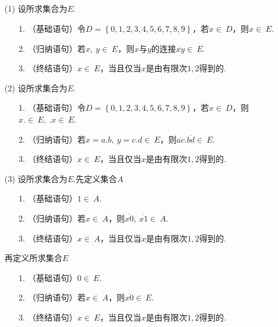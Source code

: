 \documentclass[UTF8]{ctexart}
\begin{document}
\subsection{}   %
\begin{enumerate}
    \item [(1)]设所求集合为$E$.
    \begin{enumerate}
        \item [1.]（基础语句）令$D=\left\{0,1,2,3,4,5,6,7,8,9\right\}$，若$x\in\ D$，则$x\in\ E$.
        \item [2.]（归纳语句）若$x,\ y\in\ E$，则$x$与$y$的连接$\overline{xy}\in\ E$.
        \item [3.]（终结语句）$x\in \ E$，当且仅当$x$是由有限次$1,2$得到的.
    \end{enumerate}

    \item [(2)]设所求集合为$E$.
    \begin{enumerate}
        \item [1.]（基础语句）令$D=\left\{0,1,2,3,4,5,6,7,8,9\right\}$，若$x\in\ D$，则$x.\in\ E,\ .x\in\ E$.
        \item [2.]（归纳语句）若$x=a.b,\ y=c.d\in\ E$，则$\overline{ac} . \overline{bd}\in\ E$.
        \item [3.]（终结语句）$x\in \ E$，当且仅当$x$是由有限次$1,2$得到的.
    \end{enumerate}

    \item [(3)]设所求集合为$E$.先定义集合$A$
    \begin{enumerate}
        \item [1.]（基础语句）$1\in\ A$.
        \item [2.]（归纳语句）若$x\in\ A$，则$\overline{x0},\ \overline{x1}\in \ A$.
        \item [3.]（终结语句）$x\in \ A$，当且仅当$x$是由有限次$1,2$得到的.
    \end{enumerate}
    再定义所求集合$E$
    \begin{enumerate}
        \item [1.]（基础语句）$0\in\ E$.
        \item [2.]（归纳语句）若$x\in\ A$，则$\overline{x0}\in \ E$.
        \item [3.]（终结语句）$x\in \ E$，当且仅当$x$是由有限次$1,2$得到的.
    \end{enumerate}
\end{enumerate}
\end{document}

